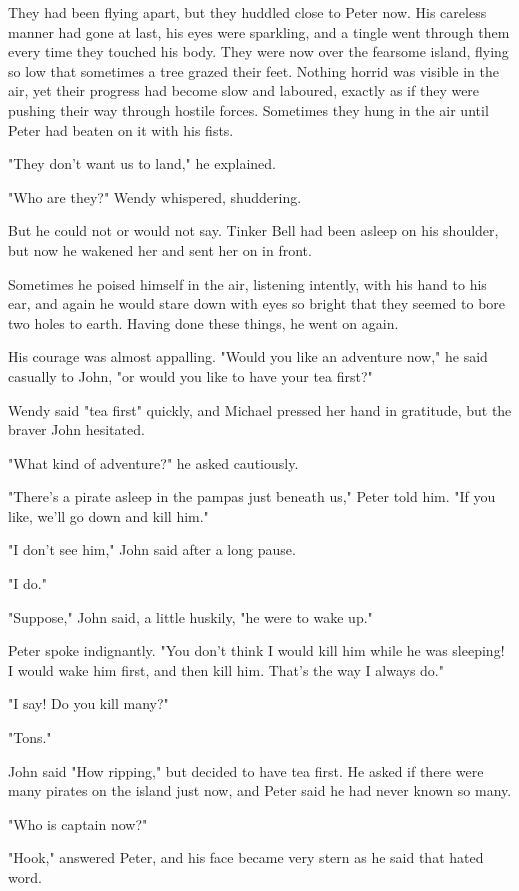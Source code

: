 They had been flying apart, but they huddled close to Peter now.
His careless manner had gone at last, his eyes were sparkling, and a tingle went through them every time they touched his body.
They were now over the fearsome island, flying so low that sometimes a tree grazed their feet.
Nothing horrid was visible in the air, yet their progress had become slow and laboured, exactly as if they were pushing their way through hostile forces.
Sometimes they hung in the air until Peter had beaten on it with his fists.

"They don't want us to land," he explained.

"Who are they?\@" Wendy whispered, shuddering.

But he could not or would not say.
Tinker Bell had been asleep on his shoulder, but now he wakened her and sent her on in front.

Sometimes he poised himself in the air, listening intently, with his hand to his ear, and again he would stare down with eyes so bright that they seemed to bore two holes to earth.
Having done these things, he went on again.

His courage was almost appalling.
"Would you like an adventure now," he said casually to John, "or would you like to have your tea first?"

Wendy said "tea first" quickly, and Michael pressed her hand in gratitude, but the braver John hesitated.

"What kind of adventure?\@" he asked cautiously.

"There's a pirate asleep in the pampas just beneath us," Peter told him.
"If you like, we'll go down and kill him."

"I don't see him," John said after a long pause.

"I do."

"Suppose," John said, a little huskily, "he were to wake up."

Peter spoke indignantly.
"You don't think I would kill him while he was sleeping!
I would wake him first, and then kill him.
That's the way I always do."

"I say!
Do you kill many?"

"Tons."

John said "How ripping," but decided to have tea first.
He asked if there were many pirates on the island just now, and Peter said he had never known so many.

"Who is captain now?"

"Hook," answered Peter, and his face became very stern as he said that hated word.

